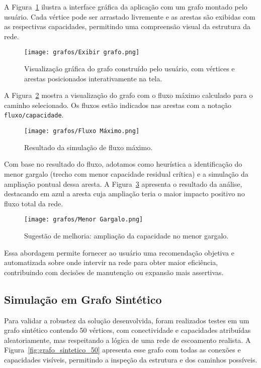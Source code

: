 \documentclass[12pt]{article}
\begin{document}
A Figura~\ref{fig:grafo_exibido} ilustra a interface gráfica da aplicação com um grafo montado pelo usuário. Cada vértice pode ser arrastado livremente e as arestas são exibidas com as respectivas capacidades, permitindo uma compreensão visual da estrutura da rede.

\begin{figure}[H]
\centering
\texttt{[image: grafos/Exibir grafo.png]}
\caption{Visualização gráfica do grafo construído pelo usuário, com vértices e arestas posicionados interativamente na tela.}
\label{fig:grafo_exibido}
\end{figure}

A Figura~\ref{fig:fluxo_maximo} mostra a visualização do grafo com o fluxo máximo calculado para o caminho selecionado. Os fluxos estão indicados nas arestas com a notação \texttt{fluxo/capacidade}.

\begin{figure}[H]
\centering
\texttt{[image: grafos/Fluxo Máximo.png]}
\caption{Resultado da simulação de fluxo máximo.}
\label{fig:fluxo_maximo}
\end{figure}

Com base no resultado do fluxo, adotamos como heurística a identificação do menor gargalo (trecho com menor capacidade residual crítica) e a simulação da ampliação pontual dessa aresta. A Figura~\ref{fig:sugestao_melhoria} apresenta o resultado da análise, destacando em azul a aresta cuja ampliação teria o maior impacto positivo no fluxo total da rede.

\begin{figure}[H]
\centering
\texttt{[image: grafos/Menor Gargalo.png]}
\caption{Sugestão de melhoria: ampliação da capacidade no menor gargalo.}
\label{fig:sugestao_melhoria}
\end{figure}

Essa abordagem permite fornecer ao usuário uma recomendação objetiva e automatizada sobre onde intervir na rede para obter maior eficiência, contribuindo com decisões de manutenção ou expansão mais assertivas.

\subsection{Simulação em Grafo Sintético}

Para validar a robustez da solução desenvolvida, foram realizados testes em um grafo sintético contendo 50 vértices, com conectividade e capacidades atribuídas aleatoriamente, mas respeitando a lógica de uma rede de escoamento realista. A Figura~\ref{fig:grafo_sintetico_50} apresenta esse grafo com todas as conexões e capacidades visíveis, permitindo a inspeção da estrutura e dos caminhos possíveis.
\end{document}
